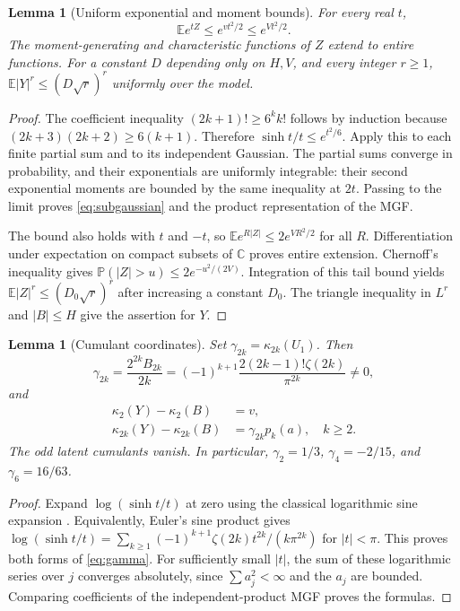 \documentclass[11pt,letterpaper]{article}
\numberwithin{equation}{section}
\newtheorem{lemma}[theorem]{Lemma}
\theoremstyle{definition}
\theoremstyle{remark}
\newcommand{\E}{\mathbb E}
\newcommand{\Prob}{\mathbb P}
\begin{document}
\begin{lemma}[Uniform exponential and moment bounds]
\label{lem:subgaussian}
For every real $t$,
\begin{equation}
 \E e^{tZ}\le e^{vt^2/2}\le e^{Vt^2/2}.
 \label{eq:subgaussian}
\end{equation}
The moment-generating and characteristic functions of $Z$ extend to entire
functions. For a constant $D$ depending only on $H,V$, and every integer
$r\ge1$, $\E|Y|^r\le(D\sqrt r)^r$ uniformly over the model.
\end{lemma}
\begin{proof}
The coefficient inequality $(2k+1)!\ge6^k k!$ follows by induction because
$(2k+3)(2k+2)\ge6(k+1)$. Therefore
$\sinh t/t\le e^{t^2/6}$. Apply this to each finite partial sum and to its
independent Gaussian. The partial sums converge in probability, and their
exponentials are uniformly integrable: their second exponential moments are
bounded by the same inequality at $2t$. Passing to the limit proves
\eqref{eq:subgaussian} and the product representation of the MGF.

The bound also holds with $t$ and $-t$, so
$\E e^{R|Z|}\le2e^{VR^2/2}$ for all $R$. Differentiation under expectation
on compact subsets of $\mathbb C$ proves entire extension. Chernoff's
inequality gives $\Prob(|Z|>u)\le2e^{-u^2/(2V)}$. Integration of this tail
bound yields $\E|Z|^r\le(D_0\sqrt r)^r$ after increasing a constant $D_0$.
The triangle inequality in $L^r$ and $|B|\le H$ give the assertion for $Y$.
\end{proof}

\begin{lemma}[Cumulant coordinates]
\label{lem:cumulants}
Set $\gamma_{2k}=\kappa_{2k}(U_1)$. Then
\begin{equation}
 \gamma_{2k}=\frac{2^{2k}B_{2k}}{2k}
 =(-1)^{k+1}\frac{2(2k-1)!\zeta(2k)}{\pi^{2k}}\ne0,
 \label{eq:gamma}
\end{equation}
and
\begin{align}
 \kappa_2(Y)-\kappa_2(B)&=v,\label{eq:variance}\\
 \kappa_{2k}(Y)-\kappa_{2k}(B)&=\gamma_{2k}p_k(a),\quad k\ge2.
 \label{eq:cumulants}
\end{align}
The odd latent cumulants vanish. In particular,
$\gamma_2=1/3$, $\gamma_4=-2/15$, and $\gamma_6=16/63$.
\end{lemma}
\begin{proof}
Expand $\log(\sinh t/t)$ at zero using the classical logarithmic sine
expansion \cite[Eq.~4.19.7]{dlmf}. Equivalently, Euler's sine product gives
$\log(\sinh t/t)=\sum_{k\ge1}(-1)^{k+1}\zeta(2k)t^{2k}/(k\pi^{2k})$
for $|t|<\pi$. This proves both forms of \eqref{eq:gamma}.
For sufficiently small $|t|$, the sum of these logarithmic series over $j$
converges absolutely, since $\sum a_j^2<\infty$ and the $a_j$ are bounded.
Comparing coefficients of the independent-product MGF proves the formulas.
\end{proof}
\end{document}
